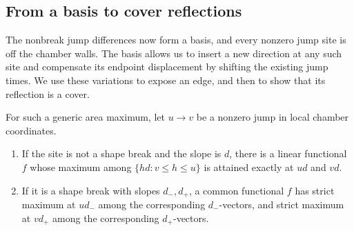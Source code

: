 \subsection{From a basis to cover reflections}

The nonbreak jump differences now form a basis, and every nonzero
jump site is off the chamber walls.  The basis allows us to insert a
new direction at any such site and compensate its endpoint displacement
by shifting the existing jump times.  We use these variations to
expose an edge, and then to show that its reflection is a cover.

\begin{lemma}\label{real:exposure}
For such a generic area maximum, let $u\to v$ be a nonzero jump in
local chamber coordinates.
\begin{enumerate}[label=\textup{(\roman*)}]
\item If the site is not a shape break and the slope is $d$, there
is a linear functional $f$ whose maximum among
$\{hd:v\le h\le u\}$ is attained exactly at $ud$ and $vd$.
\item If it is a shape break with slopes $d_-,d_+$, a common
functional $f$ has strict maximum at $ud_-$ among the corresponding
$d_-$-vectors, and strict maximum at $vd_+$ among the corresponding
$d_+$-vectors.
\end{enumerate}
\end{lemma}

